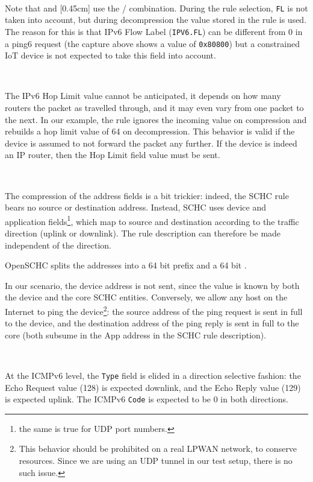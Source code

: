 ~

Note that  and [0.45cm] use the / combination. During the rule selection, \texttt{FL} is not taken into account, but during decompression the value stored in the rule is used. The reason for this is that IPv6 Flow Label (\texttt{IPV6.FL}) can be different from 0 in a ping6 request (the capture above shows a value of \texttt{0x80800}) but a constrained IoT device is not expected to take this field into account. 

~

The IPv6 Hop Limit value cannot be anticipated, it depends on how many routers the packet as travelled through, and it may even vary from one packet to the next. In our example, the rule ignores the incoming value on compression and rebuilds a hop limit value of 64 on decompression. This behavior is valid if the device is assumed to not forward the packet any further. If the device is indeed an IP router, then the Hop Limit field value must be sent.

~

The compression of the address fields is a bit trickier: indeed, the SCHC rule bears no source or destination address. Instead, SCHC uses device and application  fields\footnote{the same is true for UDP port numbers.}, which map to source and destination according to the traffic direction (uplink or downlink). The rule description can therefore be made independent of the direction.

OpenSCHC splits the addresses into a 64 bit prefix and a 64 bit . 

In our scenario, the device address is not sent, since the value is known by both the device and the core SCHC entities. Conversely, we allow any host on the Internet to ping the device\footnote{This behavior should be prohibited on a real LPWAN network, to conserve resources. Since we are using an UDP tunnel in our test setup, there is no such issue.}: the source address of the ping request is sent in full to the device, and the destination address of the ping reply is sent in full to the core (both subsume in the App address in the SCHC rule description).

~~

At the ICMPv6 level, the \texttt{Type} field is elided in a direction selective fashion: the Echo Request value (128) is expected downlink, and the Echo Reply value (129) is expected uplink. The ICMPv6 \texttt{Code} is expected to be 0 in both directions.


